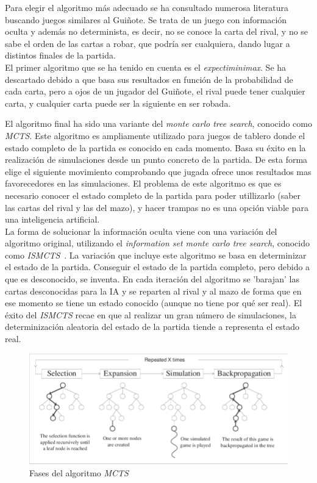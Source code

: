 Para elegir el algoritmo más adecuado se ha consultado numerosa literatura buscando juegos similares al Guiñote. Se trata de un juego con información oculta y además no determinista, es decir, no se conoce la carta del rival, y no se sabe el orden de las cartas a robar, que podría ser cualquiera, dando lugar a distintos finales de la partida.\\

El primer algoritmo que se ha tenido en cuenta es el \textit{expectiminimax}. Se ha descartado debido a que basa sus resultados en función de la probabilidad de cada carta, pero a ojos de un jugador del Guiñote, el rival puede tener cualquier carta, y cualquier carta puede ser la siguiente en ser robada.

El algoritmo final ha sido una variante del \textit{monte carlo tree search}, conocido como \textit{MCTS}. Este algoritmo es ampliamente utilizado para juegos de tablero donde el estado completo de la partida es conocido en cada momento. Basa su éxito en la realización de simulaciones desde un punto concreto de la partida. De esta forma elige el siguiente movimiento comprobando que jugada ofrece unos resultados mas favorecedores en las simulaciones. El problema de este algoritmo es que es necesario conocer el estado completo de la partida para poder utillizarlo (saber las cartas del rival y las del mazo), y hacer trampas no es una opción viable para una inteligencia artificial.\\

La forma de solucionar la información oculta viene con una variación del algoritmo original, utilizando el \textit{information set monte carlo tree search}, conocido como \textit{ISMCTS}~\cite{ismcts}. La variación que incluye este algoritmo se basa en determinizar el estado de la partida. Conseguir el estado de la partida completo, pero debido a que es desconocido, se inventa. En cada iteración del algoritmo se 'barajan' las cartas desconocidas para la IA y se reparten al rival y al mazo de forma que en ese momento se tiene un estado conocido (aunque no tiene por qué ser real). El éxito del \textit{ISMCTS} recae en que al realizar un gran número de simulaciones, la determinización aleatoria del estado de la partida tiende a representa el estado real.

\begin{figure}[H]
\centering
\includegraphics[scale = 1]{figuras/mcts}
\caption{Fases del algoritmo \textit{MCTS} \cite{ismcts2}}
\label{fig:mcts}
\end{figure}

